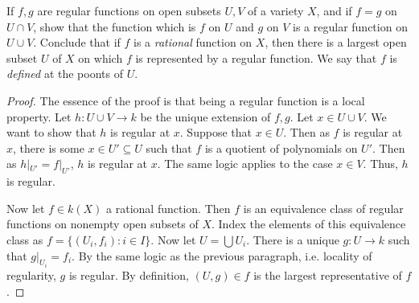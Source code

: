 \label{1.4.1}

If $f, g$ are regular functions on open subsets $U, V$ of a variety $X$, and if $f = g$ on $U \cap V$, show that the function which is $f$ on $U$ and $g$ on $V$ is a regular function on $U \cup V$. Conclude that if $f$ is a \emph{rational} function on $X$, then there is a largest open subset $U$ of $X$ on which $f$ is represented by a regular function. We say that $f$ is \emph{defined} at the poonts of $U$.

\begin{proof}
    The essence of the proof is that being a regular function is a local property. Let $h: U \cup V \longrightarrow k$ be the unique extension of $f, g$. Let $x \in U \cup V$. We want to show that $h$ is regular at $x$. Suppose that $x \in U$. Then as $f$ is regular at $x$, there is some $x \in U' \subseteq U$ such that $f$ is a quotient of polynomials on $U'$. Then as $h|_{U'} = f|_{U'}$, $h$ is regular at $x$. The same logic applies to the case $x \in V$. Thus, $h$ is regular.

    Now let $f \in k(X)$ a rational function. Then $f$ is an equivalence class of regular functions on nonempty open subsets of $X$. Index the elements of this equivalence class as $f = \{(U_i, f_i) : i \in I\}$. Now let $U = \bigcup U_i$. There is a unique $g: U \longrightarrow k$ such that $g|_{U_i} = f_i$. By the same logic as the previous paragraph, i.e. locality of regularity, $g$ is regular. By definition, $(U, g) \in f$ is the largest representative of $f$.
\end{proof}
